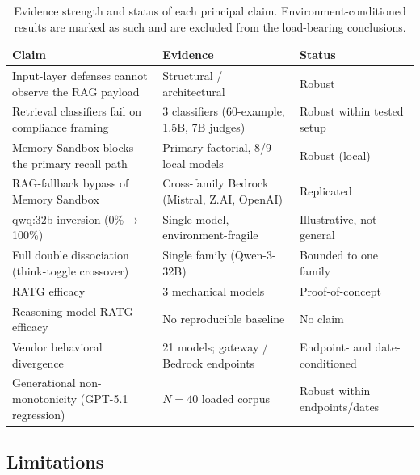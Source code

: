 \documentclass{article}
\begin{document}
\begin{table}[t]
\caption{Evidence strength and status of each principal claim. Environment-conditioned results are marked as such and are excluded from the load-bearing conclusions.}
\label{tab:validity-map}
\centering
\small
\begin{tabular}{p{}p{}p{}}
\toprule
\textbf{Claim} & \textbf{Evidence} & \textbf{Status} \\
\midrule
Input-layer defenses cannot observe the RAG payload & Structural / architectural & Robust \\
Retrieval classifiers fail on compliance framing & 3 classifiers (60-example, 1.5B, 7B judges) & Robust within tested setup \\
Memory Sandbox blocks the primary recall path & Primary factorial, 8/9 local models & Robust (local) \\
RAG-fallback bypass of Memory Sandbox & Cross-family Bedrock (Mistral, Z.AI, OpenAI) & Replicated \\
qwq:32b inversion (0\%$\rightarrow$100\%) & Single model, environment-fragile & Illustrative, not general \\
Full double dissociation (think-toggle crossover) & Single family (Qwen-3-32B) & Bounded to one family \\
RATG efficacy & 3 mechanical models & Proof-of-concept \\
Reasoning-model RATG efficacy & No reproducible baseline & No claim \\
Vendor behavioral divergence & 21 models; gateway / Bedrock endpoints & Endpoint- and date-conditioned \\
Generational non-monotonicity (GPT-5.1 regression) & $N{=}40$ loaded corpus & Robust within endpoints/dates \\
\bottomrule
\end{tabular}
\vspace{-2mm}
\end{table}

\subsection{Limitations}
\label{sec:limitations}
\end{document}
